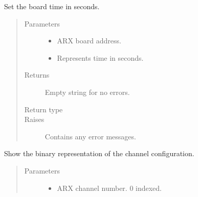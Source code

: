 \documentclass[letterpaper,10pt,english]{sphinxmanual}
\begin{document}
\begin{fulllineitems}
\begin{fulllineitems}
\end{fulllineitems}


\begin{fulllineitems}
\label{\detokenize{index:lwautils.lwa_arx.ARX.set_time}}
Set the board time in seconds.
\begin{quote}\begin{description}
\item[{Parameters}] \leavevmode\begin{itemize}
\item {} 
 \textendash{} ARX board address.

\item {} 
 \textendash{} Represents time in seconds.

\end{itemize}

\item[{Returns}] \leavevmode
Empty string for no errors.

\item[{Return type}] \leavevmode
{}

\item[{Raises}] \leavevmode
{} \textendash{} Contains any error messages.

\end{description}\end{quote}

\end{fulllineitems}


\begin{fulllineitems}
\label{\detokenize{index:lwautils.lwa_arx.ARX.show_chan_cfg}}
Show the binary representation of the channel configuration.
\begin{quote}\begin{description}
\item[{Parameters}] \leavevmode\begin{itemize}
\item {} 
 \textendash{} ARX channel number. 0 indexed.


\end{itemize}
\end{description}
\end{quote}
\end{fulllineitems}
\end{fulllineitems}
\end{document}
